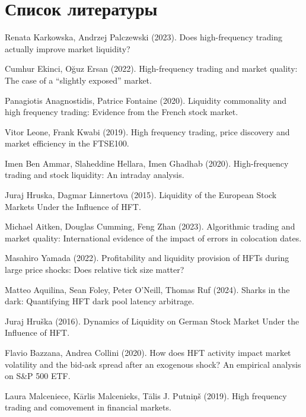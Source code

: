 \documentclass{letask}
\begin{document}
\section{Список литературы}
Renata Karkowska, Andrzej Palczewski (2023). Does high-frequency trading actually improve market liquidity?

Cumhur Ekinci, Oğuz Ersan (2022). High-frequency trading and market quality: The case of a “slightly exposed” market.

Panagiotis Anagnostidis, Patrice Fontaine (2020). Liquidity commonality and high frequency trading: Evidence from the French stock market.

Vitor Leone, Frank Kwabi (2019). High frequency trading, price discovery and market efficiency in the FTSE100.

Imen Ben Ammar, Slaheddine Hellara, Imen Ghadhab (2020). High-frequency trading and stock liquidity: An intraday analysis.

Juraj Hruska, Dagmar Linnertova (2015). Liquidity of the European Stock Markets Under the Influence of HFT.

Michael Aitken, Douglas Cumming, Feng Zhan (2023). Algorithmic trading and market quality: International evidence of the impact of errors in colocation dates.

Masahiro Yamada (2022). Profitability and liquidity provision of HFTs during large price shocks: Does relative tick size matter?

Matteo Aquilina, Sean Foley, Peter O'Neill, Thomas Ruf (2024). Sharks in the dark: Quantifying HFT dark pool latency arbitrage.

Juraj Hruška (2016). Dynamics of Liquidity on German Stock Market Under the Influence of HFT.

Flavio Bazzana, Andrea Collini (2020). How does HFT activity impact market volatility and the bid-ask spread after an exogenous shock? An empirical analysis on S&P 500 ETF.

Laura Malceniece, Kārlis Malcenieks, Tālis J. Putniņš (2019). High frequency trading and comovement in financial markets.
\end{document}
